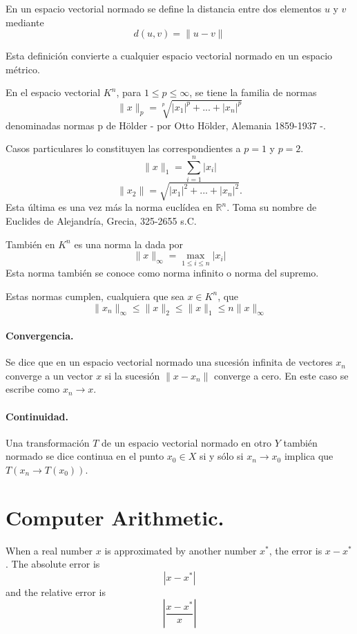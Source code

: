 En un espacio vectorial normado se define la distancia entre dos elementos $u$ y $v$ mediante
\[ d(u,v) = \|u-v\| \]

Esta definición convierte a cualquier espacio vectorial normado en un espacio métrico.

En el espacio vectorial $K^n$, para $1 \leq p \leq \infty$, se tiene la familia de normas
\[ \|x\|_p = \sqrt[p]{|x_1|^p+...+|x_n|^p} \]
denominadas normas p de Hölder - por Otto Hölder, Alemania 1859-1937 -.

Casos particulares lo constituyen las correspondientes a $p = 1$ y $p = 2$.
\[ \|x\|_1 = \sum_{i=1}^{n}{|x_i|} \]
\[ \|x_2\| = \sqrt{|x_1|^2 + ... + |x_n|^2}. \]
Esta última es una vez más la norma euclídea en $\mathbb{R}^n$. Toma su nombre de Euclides de Alejandría, Grecia, 325-2655 s.C.

También en $K^n$ es una norma la dada por 
\[ \|x\|_\infty = \max_{1\leq i \leq n}{|x_i|} \]
Esta norma también se conoce como norma infinito o norma del supremo.

Estas normas cumplen, cualquiera que sea $x \in K^n$, que 
\[ \|x_n\|_\infty \leq \|x\|_2 \leq \|x\|_1 \leq n \|x\|_\infty \]

\paragraph{Convergencia.}
Se dice que en un espacio vectorial normado una sucesión infinita de vectores ${x_n}$ converge a un vector $x$ si la sucesión ${\|x - x_n\|}$ converge a cero. En este caso se escribe como $x_n \rightarrow x$.

\paragraph{Continuidad.}
Una transformación $T$ de un espacio vectorial normado en otro $Y$ también normado se dice continua en el punto $x_0 \in X$ si y sólo si $x_n \rightarrow x_0$ implica que $T(x_n \rightarrow T(x_0))$.

\section{Computer Arithmetic.}
When a real number $x$ is approximated by another number $x^*$, the error is $x - x^*$. The absolute error is
\[ |x - x^*| \]
and the relative error is 
\[ |\frac{x - x^*}{x}| \]


